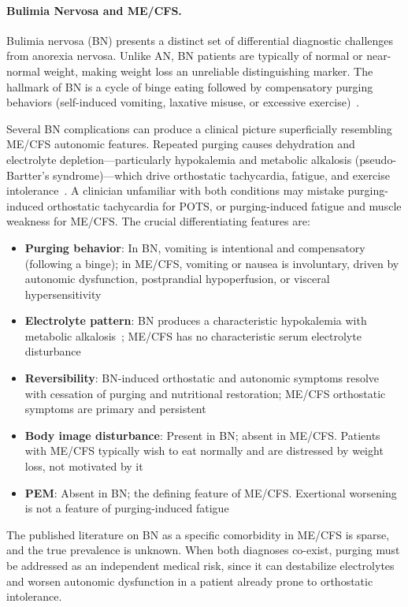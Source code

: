 \paragraph{Bulimia Nervosa and ME/CFS.}
Bulimia nervosa (BN) presents a distinct set of differential diagnostic challenges from anorexia nervosa. Unlike AN, BN patients are typically of normal or near-normal weight, making weight loss an unreliable distinguishing marker. The hallmark of BN is a cycle of binge eating followed by compensatory purging behaviors (self-induced vomiting, laxative misuse, or excessive exercise)~\cite{Mehler2015bulimia}.

Several BN complications can produce a clinical picture superficially resembling ME/CFS autonomic features. Repeated purging causes dehydration and electrolyte depletion---particularly hypokalemia and metabolic alkalosis (pseudo-Bartter's syndrome)---which drive orthostatic tachycardia, fatigue, and exercise intolerance~\cite{Mehler2015bulimia}. A clinician unfamiliar with both conditions may mistake purging-induced orthostatic tachycardia for POTS, or purging-induced fatigue and muscle weakness for ME/CFS. The crucial differentiating features are:

\begin{itemize}
    \item \textbf{Purging behavior}: In BN, vomiting is intentional and compensatory (following a binge); in ME/CFS, vomiting or nausea is involuntary, driven by autonomic dysfunction, postprandial hypoperfusion, or visceral hypersensitivity
    \item \textbf{Electrolyte pattern}: BN produces a characteristic hypokalemia with metabolic alkalosis~\cite{Mehler2015bulimia}; ME/CFS has no characteristic serum electrolyte disturbance
    \item \textbf{Reversibility}: BN-induced orthostatic and autonomic symptoms resolve with cessation of purging and nutritional restoration; ME/CFS orthostatic symptoms are primary and persistent
    \item \textbf{Body image disturbance}: Present in BN; absent in ME/CFS. Patients with ME/CFS typically wish to eat normally and are distressed by weight loss, not motivated by it
    \item \textbf{PEM}: Absent in BN; the defining feature of ME/CFS. Exertional worsening is not a feature of purging-induced fatigue
\end{itemize}

The published literature on BN as a specific comorbidity in ME/CFS is sparse, and the true prevalence is unknown. When both diagnoses co-exist, purging must be addressed as an independent medical risk, since it can destabilize electrolytes and worsen autonomic dysfunction in a patient already prone to orthostatic intolerance.

